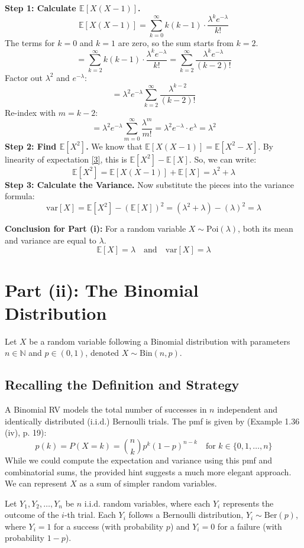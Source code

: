 \documentclass[11pt,a4paper]{article}
\theoremstyle{named}
\begin{document}
\textbf{Step 1: Calculate $\mathbb{E}[X(X-1)]$.}
\[
\mathbb{E}[X(X-1)] = \sum_{k=0}^{\infty} k(k-1) \cdot \frac{\lambda^k e^{-\lambda}}{k!}
\]
The terms for $k=0$ and $k=1$ are zero, so the sum starts from $k=2$.
\[
= \sum_{k=2}^{\infty} k(k-1) \cdot \frac{\lambda^k e^{-\lambda}}{k!} = \sum_{k=2}^{\infty} \frac{\lambda^k e^{-\lambda}}{(k-2)!}
\]
Factor out $\lambda^2$ and $e^{-\lambda}$:
\[
= \lambda^2 e^{-\lambda} \sum_{k=2}^{\infty} \frac{\lambda^{k-2}}{(k-2)!}
\]
Re-index with $m = k-2$:
\[
= \lambda^2 e^{-\lambda} \sum_{m=0}^{\infty} \frac{\lambda^m}{m!} = \lambda^2 e^{-\lambda} \cdot e^\lambda = \lambda^2
\]
\textbf{Step 2: Find $\mathbb{E}[X^2]$.}
We know that $\mathbb{E}[X(X-1)] = \mathbb{E}[X^2 - X]$. By linearity of expectation \hyperlink{note:3}{[3]}, this is $\mathbb{E}[X^2] - \mathbb{E}[X]$. So, we can write:
\[
\mathbb{E}[X^2] = \mathbb{E}[X(X-1)] + \mathbb{E}[X] = \lambda^2 + \lambda
\]
\textbf{Step 3: Calculate the Variance.}
Now substitute the pieces into the variance formula:
\[
\text{var}[X] = \mathbb{E}[X^2] - (\mathbb{E}[X])^2 = (\lambda^2 + \lambda) - (\lambda)^2 = \lambda
\]

\textbf{Conclusion for Part (i):} For a random variable $X \sim \text{Poi}(\lambda)$, both its mean and variance are equal to $\lambda$.
\[
\mathbb{E}[X] = \lambda \quad \text{and} \quad \text{var}[X] = \lambda
\]

\section{Part (ii): The Binomial Distribution}
Let $X$ be a random variable following a Binomial distribution with parameters $n \in \mathbb{N}$ and $p \in (0,1)$, denoted $X \sim \text{Bin}(n,p)$.

\subsection{Recalling the Definition and Strategy}
A Binomial RV models the total number of successes in $n$ independent and identically distributed (i.i.d.) Bernoulli trials. The pmf is given by (Example 1.36 (iv), p. 19):
\[
p(k) = P(X=k) = \binom{n}{k} p^k (1-p)^{n-k} \quad \text{for } k \in \{0, 1, \dots, n\}
\]
While we could compute the expectation and variance using this pmf and combinatorial sums, the provided hint suggests a much more elegant approach. We can represent $X$ as a sum of simpler random variables.

Let $Y_1, Y_2, \dots, Y_n$ be $n$ i.i.d. random variables, where each $Y_i$ represents the outcome of the $i$-th trial. Each $Y_i$ follows a Bernoulli distribution, $Y_i \sim \text{Ber}(p)$, where $Y_i=1$ for a success (with probability $p$) and $Y_i=0$ for a failure (with probability $1-p$).
\end{document}
